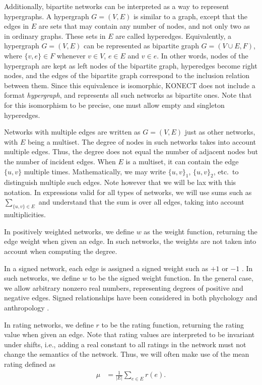 \documentclass{article}
\begin{document}
Additionally, bipartite networks can be interpreted as a way to
represent hypergraphs.  A hypergraph $G=(V,E)$ is similar to a graph,
except that the edges in $E$ are sets that may contain any number of
nodes, and not only two as in ordinary graphs.  These sets in $E$ are
called hyperedges.  Equivalently, a
hypergraph $G=(V,E)$ can be represented as bipartite graph $G=(V \cup E,
F)$, where $\{v,e\} \in F$ whenever $v\in V$, $e \in E$ and $v \in e$.
In other words, nodes of the hypergraph are kept as left nodes of the
bipartite graph, hyperedges become right nodes, and the edges of the
bipartite graph correspond to the inclusion relation between them.
Since this equivalence is isomorphic, KONECT does not include a format
\emph{hypergraph}, and represents all such networks as bipartite ones.
Note that for this isomorphism to be precise, one must allow empty and
singleton hyperedges. 

Networks with multiple edges are written as $G=(V,E)$ just as other networks, with $E$ being
a multiset.  The degree of nodes in such networks takes into account
multiple edges.  Thus, the degree does not equal the number of adjacent
nodes but the number of incident edges.  When $E$ is a multiset, it can
contain the edge $\{u,v\}$ multiple times.  Mathematically, we 
may write $\{u,v\}_1$, $\{u,v\}_2$, etc.\ to distinguish multiple such
edges.   Note however that we will be lax with
this notation.  In expressions valid for all types of networks, we will
use sums such as $\sum_{\{u,v\}\in E}$ and understand that the sum
is over all edges, taking into account multiplicities. 

In positively weighted networks, we define $w$ as the
weight function, returning the edge weight when given an edge. In such
networks, the weights are not taken into account when computing the
degree. 

In a signed network, each edge is assigned a signed weight such as $+1$
or $-1$ \citep{b647}.  In such networks, we define $w$ to be the signed weight
function.  In the general case, we allow arbitrary nonzero real numbers,
representing degrees of positive and negative edges.  Signed
relationships have been considered in both phychology \citep{b862} and
anthropology \citep{b323}.  

In rating networks, we define $r$ to be
the rating function, returning the rating value when given an edge.  Note
that rating values are interpreted to be invariant under shifts, i.e.,
adding a real constant to all ratings in the network must not
change the semantics of the network.  Thus, we will often make use of
the mean rating defined as
\begin{align}
  \mu &= \frac 1 {|E|} \sum_{e\in E} r(e). 
\end{align}
\end{document}
